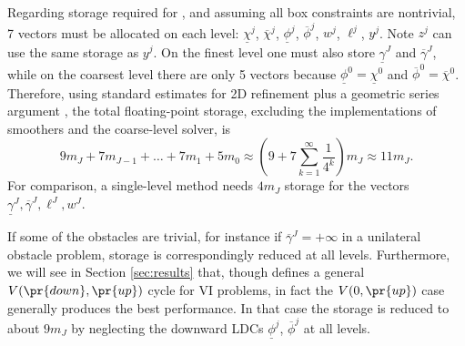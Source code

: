 \documentclass[letterpaper,final,12pt,reqno]{amsart}
\theoremstyle{cstyle}
\theoremstyle{cstyle*}
\theoremstyle{dstyle}
\numberwithin{equation}{section}
\numberwithin{figure}{section}
\numberwithin{table}{section}
\numberwithin{theorem}{section}
\begin{document}
Regarding storage required for , and assuming all box constraints are nontrivial, 7 vectors must be allocated on each level: $\underline{\chi}^j$, $\overline{\chi}^j$, $\underline{\phi}^j$, $\overline{\phi}^j$, $w^j$, $\ell^j$, $y^j$.  Note $z^j$ can use the same storage as $y^j$.  On the finest level one must also store $\underline{\gamma}^J$ and $\overline{\gamma}^J$, while on the coarsest level there are only 5 vectors because $\underline{\phi}^0=\underline{\chi}^0$ and $\overline{\phi}^0=\overline{\chi}^0$.  Therefore, using standard estimates for 2D refinement plus a geometric series argument \cite{Trottenbergetal2001}, the total floating-point storage, excluding the implementations of smoothers and the coarse-level solver, is
\begin{equation}
9 m_J + 7 m_{J-1} + \dots + 7 m_1 + 5 m_0 \approx \left(9 + 7 \sum_{k=1}^\infty \frac{1}{4^k}\right) m_J \approx 11 m_J.
\end{equation}
For comparison, a single-level method needs $4 m_J$ storage for the vectors $\underline{\gamma}^J,\overline{\gamma}^J,\ell^J,w^J$.

If some of the obstacles are trivial, for instance if $\overline{\gamma}^J=+\infty$ in a unilateral obstacle problem, storage is correspondingly reduced at all levels.  Furthermore, we will see in Section \ref{sec:results} that, though  defines a general $V(\pr{down},\pr{up})$ cycle for VI problems, in fact the $V(0,\pr{up})$ case generally produces the best performance.  In that case the storage is reduced to about $9 m_J$ by neglecting the downward LDCs $\underline{\phi}^j$, $\overline{\phi}^j$ at all levels.
\end{document}
